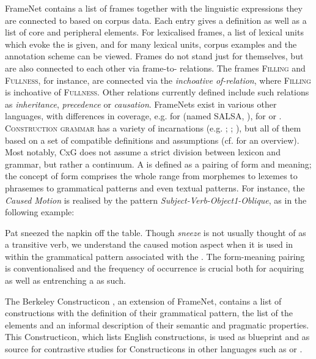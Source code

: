 \documentclass[output=paper]{LSP/langsci}
\begin{document}
FrameNet \citep{Fillmore2003} contains a list of frames together with the linguistic expressions they are connected to based on corpus data. Each  entry gives a definition as well as a list of core and peripheral  elements. For lexicalised frames, a list of lexical units which evoke the  is given, and for many lexical units, corpus examples and the annotation scheme can be viewed. Frames do not stand just for themselves, but are also connected to each other via frame-to- relations. The frames \textsc{Filling} and \textsc{Fullness}, for instance, are connected via the \textit{inchoative of-relation}, where \textsc{Filling} is inchoative of \textsc{Fullness}. Other relations currently defined include such relations as \textit{inheritance}, \textit{precedence} or \textit{causation}. FrameNets exist in various other languages, with differences in coverage, e.g. for  (named SALSA, \citealt{Burchardt2006}), for  \citep{Ohara2004} or  \citep{Subirats2003}.\\

\noindent \textsc{Construction grammar} has a variety of incarnations (e.g. 
\citealt{Fillmore1985Syntactic}; \citealt{Fillmore2012};
\citealt{Goldberg1995,Goldberg2006}%
), but all of them based on a set of compatible definitions and assumptions (cf. \citealt{Stefanowitsch2007} for an overview). Most notably, CxG does not assume a strict division between lexicon and grammar, but rather a continuum. A  is defined as a pairing of form and meaning; the concept of form comprises the whole range from morphemes to lexemes to phrasemes to grammatical patterns and even textual patterns. For instance, the \textit{Caused Motion}  \citep[3, 9f.]{Goldberg1995} is realised by the pattern \textit{Subject-Verb-Object1-Oblique}, as in the following example:

\ea\label{czulo:ex:4}
Pat sneezed the napkin off the table. 
\z
Though \textit{sneeze} is not usually thought of as a transitive verb, we understand the caused motion aspect when it is used in within the grammatical pattern associated with the . The form-meaning pairing is conventionalised and the frequency of occurrence is crucial both for acquiring as well as entrenching a  as such.

The Berkeley Constructicon \citep{Fillmore2012}, an extension of FrameNet, contains a list of constructions with the definition of their grammatical pattern, the list of the  elements and an informal description of their semantic and pragmatic properties. This Constructicon, which lists English constructions, is used as blueprint and as source for contrastive studies for Constructicons in other languages such as  \citep{Skoldberg2013} or  \citep{Boas2013}.
\end{document}
